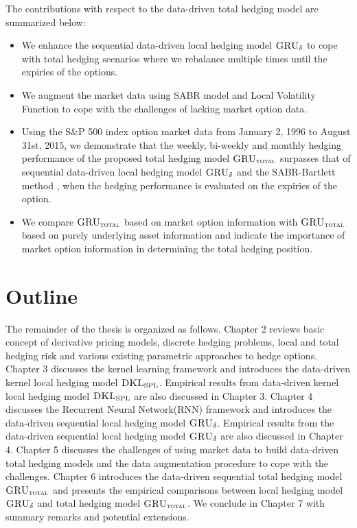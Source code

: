 \documentclass[letterpaper,12pt,titlepage,oneside,final]{book}
\numberwithin{equation}{section}
\theoremstyle{definition}
\newcommand{\model}{\textsc{GRU}_\delta}
\newcommand{\modelT}{\textsc{GRU}_{\textsc{total}}}
\newcommand{\DKLs}{\bf\textsc{DKL}_{\text{SPL}}}
\begin{document}
The contributions with respect to the data-driven total hedging model \cite{knian2020} are summarized below:
\begin{itemize}
	\item  We enhance the sequential data-driven local hedging model $\model$ \cite{knian2019} to cope with total hedging scenarios where we rebalance multiple times until the expiries of the options.
	\item  We augment the market data using SABR model and Local Volatility Function to cope with the challenges of lacking market option data.
	\item  Using the S\&P 500 index option market data from January 2, 1996 to  August 31st, 2015, we demonstrate that the weekly, bi-weekly and monthly hedging performance of the proposed total hedging model $\modelT$  surpasses that of sequential data-driven local hedging model $\model$ \cite{knian2019} and the SABR-Bartlett method \cite{bartlett2006hedging}, when the hedging performance is evaluated on the expiries of the option.
	\item We compare  $\modelT$ based on market option information with $\modelT$ based on purely underlying asset information and indicate the importance of  market option information in determining the total hedging position.
\end{itemize}
\section{Outline}
The remainder of the thesis is organized as follows.
Chapter 2 reviews basic concept of derivative pricing models, discrete hedging problems, local and total hedging risk and various existing parametric approaches to hedge options.
Chapter 3 discusses the kernel learning framework and introduces the data-driven kernel local hedging model $\DKLs$. Empirical results  from  data-driven kernel local hedging model $\DKLs$ are also discussed in Chapter 3.
Chapter 4 discusses the Recurrent Neural Network(RNN) framework and introduces the data-driven sequential local hedging model $\model$. Empirical results  from  the data-driven sequential local hedging model $\model$ are also discussed in Chapter 4.
Chapter 5 discusses the challenges of using market data to build data-driven total hedging models and the data augmentation procedure to cope with the challenges.
Chapter 6 introduces the data-driven sequential total hedging model $\modelT$ and presents the empirical comparisons between local hedging model $\model$ and total hedging model $\modelT$.
We conclude in Chapter 7 with summary remarks and potential extensions.
\end{document}
